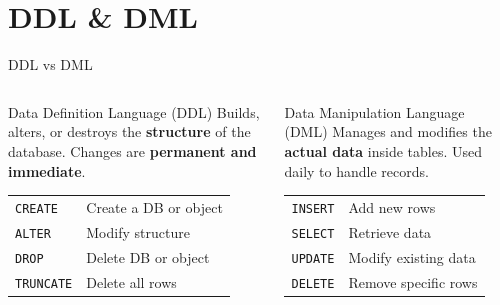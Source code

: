 
\section{DDL \& DML}

\begin{frame}{DDL vs DML}
  \begin{columns}[T]
      \begin{block}{Data Definition Language (DDL)}
        Builds, alters, or destroys the \textbf{structure} of the database.
        Changes are \textbf{permanent and immediate}.

        \vspace{0.4em}
        \renewcommand{\arraystretch}{1.2}
        \begin{tabular}{ll}
          \texttt{CREATE}   & Create a DB or object \\
          \texttt{ALTER}    & Modify structure \\
          \texttt{DROP}     & Delete DB or object \\
          \texttt{TRUNCATE} & Delete all rows \\
        \end{tabular}
      \end{block}

      \begin{exampleblock}{Data Manipulation Language (DML)}
        Manages and modifies the \textbf{actual data} inside tables.
        Used daily to handle records.

        \vspace{0.4em}
        \renewcommand{\arraystretch}{1.2}
        \begin{tabular}{ll}
          \texttt{INSERT} & Add new rows \\
          \texttt{SELECT} & Retrieve data \\
          \texttt{UPDATE} & Modify existing data \\
          \texttt{DELETE} & Remove specific rows \\
        \end{tabular}
      \end{exampleblock}
  \end{columns}
\end{frame}

